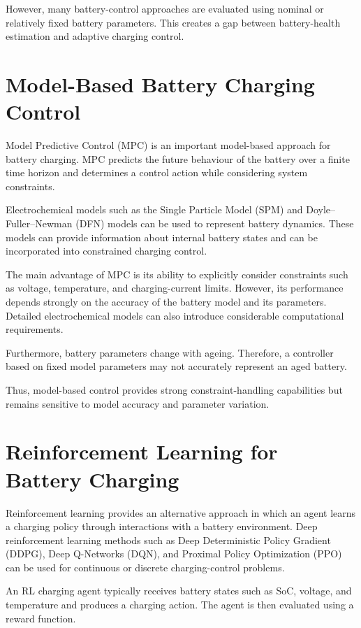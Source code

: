 However, many battery-control approaches are evaluated using nominal
or relatively fixed battery parameters. This creates a gap between
battery-health estimation and adaptive charging control.

\section{Model-Based Battery Charging Control}

Model Predictive Control (MPC) is an important model-based approach for
battery charging. MPC predicts the future behaviour of the battery over
a finite time horizon and determines a control action while considering
system constraints.

Electrochemical models such as the Single Particle Model (SPM) and
Doyle--Fuller--Newman (DFN) models can be used to represent battery
dynamics. These models can provide information about internal battery
states and can be incorporated into constrained charging control.

The main advantage of MPC is its ability to explicitly consider
constraints such as voltage, temperature, and charging-current limits.
However, its performance depends strongly on the accuracy of the
battery model and its parameters. Detailed electrochemical models can
also introduce considerable computational requirements.

Furthermore, battery parameters change with ageing. Therefore, a
controller based on fixed model parameters may not accurately represent
an aged battery.

Thus, model-based control provides strong constraint-handling
capabilities but remains sensitive to model accuracy and parameter
variation.

\section{Reinforcement Learning for Battery Charging}

Reinforcement learning provides an alternative approach in which an
agent learns a charging policy through interactions with a battery
environment. Deep reinforcement learning methods such as Deep
Deterministic Policy Gradient (DDPG), Deep Q-Networks (DQN), and
Proximal Policy Optimization (PPO) can be used for continuous or
discrete charging-control problems.

An RL charging agent typically receives battery states such as SoC,
voltage, and temperature and produces a charging action. The agent is
then evaluated using a reward function.

